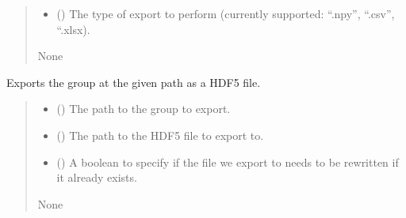 \documentclass[letterpaper,10pt,english]{sphinxmanual}
\begin{document}
\begin{fulllineitems}
\begin{fulllineitems}
\begin{quote}
\begin{description}
\begin{itemize}
\item {} 
\sphinxAtStartPar
{} () \textendash{} The type of export to perform (currently supported: “.npy”, “.csv”, “.xlsx).

\end{itemize}

\sphinxAtStartPar
None

\end{description}\end{quote}

\end{fulllineitems}


\begin{fulllineitems}
\label{\detokenize{source/_autosummary/HDF5_BLS.Wrapper:HDF5_BLS.Wrapper.export_group}}
\pysigstartsignatures
\pysiglinewithargsret
{}
{\sphinxparamcomma {}\sphinxparamcomma {}}
{}
\pysigstopsignatures
\sphinxAtStartPar
Exports the group at the given path as a HDF5 file.
\begin{quote}\begin{description}
\begin{itemize}
\item {} 
\sphinxAtStartPar
{} () \textendash{} The path to the group to export.

\item {} 
\sphinxAtStartPar
{} () \textendash{} The path to the HDF5 file to export to.

\item {} 
\sphinxAtStartPar
{} () \textendash{} A boolean to specify if the file we export to needs to be rewritten if it already exists.

\end{itemize}

\sphinxAtStartPar
None


\end{description}
\end{quote}
\end{fulllineitems}
\end{fulllineitems}
\end{document}
